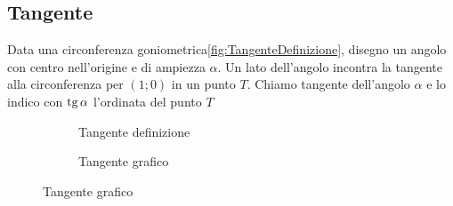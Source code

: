 \subsection{Tangente}
\begin{definizione}[Tangente]
	Data una circonferenza goniometrica\nobs\vref{fig:TangenteDefinizione}, disegno un angolo con centro nell'origine e di ampiezza $\alpha$. Un lato dell'angolo incontra la tangente  alla circonferenza  per $(1;0)$ in un punto $T$.  Chiamo tangente dell'angolo $\alpha$ e lo indico con $\operatorname{tg}\alpha$ l'ordinata  del punto $T$
\end{definizione}
\label{sec:Tangente}
\begin{figure}
	\begin{subfigure}[b]{.5\linewidth}
		\centering
			
		\caption{Tangente definizione}\label{fig:TangenteDefinizione}
	\end{subfigure}%
	\begin{subfigure}[b]{.5\linewidth}
		\centering
		\caption{Tangente grafico}\label{fig:TangenteGrafico}
	\end{subfigure}
	\label{tab:funztg}
\end{figure}
